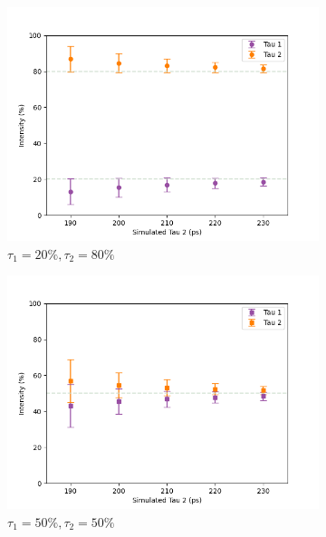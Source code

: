 \begin{figure}[p]
{\begin{subfigure}{0.7\textwidth}
        \centering
        \includegraphics[width=0.95\linewidth]{Batch 3/regular IRF/tau1 150/output/2080r.png}
        \caption{$\tau_1 = 20\%, \tau_2 = 80\%$}
        \label{fig:150-2080}
    \end{subfigure}
    \begin{subfigure}{0.7\textwidth}
        \centering
        \includegraphics[width=.95\textwidth]{Batch 3/regular IRF/tau1 150/output/5050r.png}
        \caption{$\tau_1 = 50\%, \tau_2 = 50\%$}
        \label{fig:150-5050}
    \end{subfigure}
    }
    \begin{subfigure}{0.7\textwidth}
        \centering

\end{subfigure}
\end{figure}
